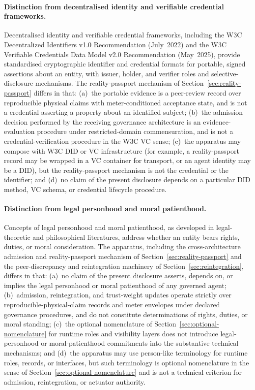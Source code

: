 \documentclass[a4paper,12pt]{article}
\begin{document}
\paragraph{Distinction from decentralised identity and verifiable
credential frameworks.}
Decentralised identity and verifiable credential frameworks,
including the W3C Decentralized Identifiers v1.0 Recommendation
(July~2022) and the W3C Verifiable Credentials Data Model v2.0
Recommendation (May~2025), provide standardised cryptographic
identifier and credential formats for portable, signed
assertions about an entity, with issuer, holder, and verifier
roles and selective-disclosure mechanisms. The reality-passport
mechanism of Section~\ref{sec:reality-passport} differs in that:
(a)~the portable evidence is a peer-review record over
reproducible physical claims with meter-conditioned acceptance
state, and is not a credential asserting a property about an
identified subject; (b)~the admission decision performed by the
receiving governance architecture is an evidence-evaluation
procedure under restricted-domain commensuration, and is not a
credential-verification procedure in the W3C VC sense;
(c)~the apparatus may compose with W3C DID or VC infrastructure
(for example, a reality-passport record may be wrapped in a VC
container for transport, or an agent identity may be a DID),
but the reality-passport mechanism is not the credential or the
identifier; and (d)~no claim of the present disclosure depends
on a particular DID method, VC schema, or credential lifecycle
procedure.

\paragraph{Distinction from legal personhood and moral
patienthood.}
Concepts of legal personhood and moral patienthood, as developed
in legal-theoretic and philosophical literatures, address
whether an entity bears rights, duties, or moral consideration.
The apparatus, including the cross-architecture admission and
reality-passport mechanism of
Section~\ref{sec:reality-passport} and the peer-discrepancy and
reintegration machinery of Section~\ref{sec:reintegration},
differs in that: (a)~no claim of the present disclosure asserts,
depends on, or implies the legal personhood or moral patienthood
of any governed agent; (b)~admission, reintegration, and
trust-weight updates operate strictly over
reproducible-physical-claim records and meter envelopes under
declared governance procedures, and do not constitute
determinations of rights, duties, or moral standing;
(c)~the optional nomenclature of
Section~\ref{sec:optional-nomenclature} for runtime roles and
visibility layers does not introduce legal-personhood or
moral-patienthood commitments into the substantive technical
mechanisms; and (d)~the apparatus may use person-like
terminology for runtime roles, records, or interfaces, but
such terminology is optional nomenclature in the sense of
Section~\ref{sec:optional-nomenclature} and is not a technical
criterion for admission, reintegration, or actuator authority.
\end{document}
